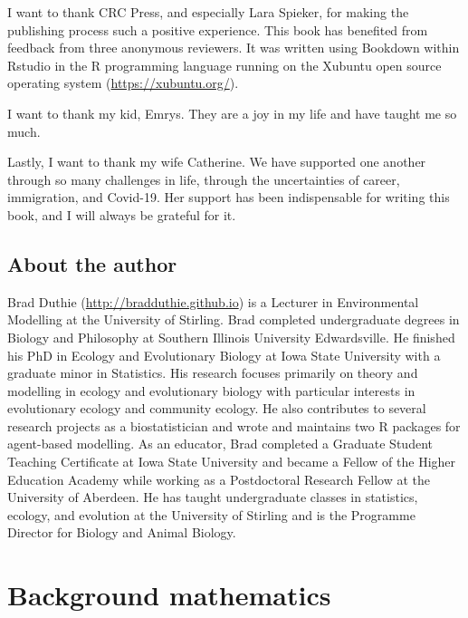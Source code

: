 \documentclass[
  openany]{krantz}
\begin{document}
I want to thank CRC Press, and especially Lara Spieker, for making the publishing process such a positive experience.
This book has benefited from feedback from three anonymous reviewers.
It was written using Bookdown \citep{xie2015, Xie2016, Xie2023} within Rstudio \citep{Rstudio} in the R programming language \citep{Rproject} running on the Xubuntu open source operating system (\url{https://xubuntu.org/}).

I want to thank my kid, Emrys.
They are a joy in my life and have taught me so much.

Lastly, I want to thank my wife Catherine.
We have supported one another through so many challenges in life, through the uncertainties of career, immigration, and Covid-19.
Her support has been indispensable for writing this book, and I will always be grateful for it.

\hypertarget{author}{%
\section*{About the author}\label{author}}


Brad Duthie (\url{http://bradduthie.github.io}) is a Lecturer in Environmental Modelling at the University of Stirling.
Brad completed undergraduate degrees in Biology and Philosophy at Southern Illinois University Edwardsville.
He finished his PhD in Ecology and Evolutionary Biology at Iowa State University with a graduate minor in Statistics.
His research focuses primarily on theory and modelling in ecology and evolutionary biology with particular interests in evolutionary ecology and community ecology.
He also contributes to several research projects as a biostatistician and wrote and maintains two R packages for agent-based modelling.
As an educator, Brad completed a Graduate Student Teaching Certificate at Iowa State University and became a Fellow of the Higher Education Academy while working as a Postdoctoral Research Fellow at the University of Aberdeen.
He has taught undergraduate classes in statistics, ecology, and evolution at the University of Stirling and is the Programme Director for Biology and Animal Biology.

\mainmatter

\hypertarget{Chapter_1}{%
\chapter{Background mathematics}\label{Chapter_1}}
\end{document}
